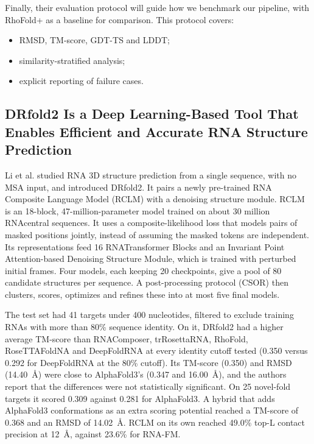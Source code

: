 \documentclass{FastFyp}
\begin{document}
Finally, their evaluation protocol will guide how we benchmark our pipeline, with RhoFold+ as a baseline for comparison. This protocol covers:
\begin{itemize}
\item RMSD, TM-score, GDT-TS and LDDT;
\item similarity-stratified analysis;
\item explicit reporting of failure cases.
\end{itemize}

\subsection{DRfold2 Is a Deep Learning-Based Tool That Enables Efficient and Accurate RNA Structure Prediction}\label{sec:drfold2}
Li et al. \cite{ref:Li:2026} studied RNA 3D structure prediction from a single sequence, with no MSA input, and introduced DRfold2. It pairs a newly pre-trained RNA Composite Language Model (RCLM) with a denoising structure module. RCLM is an 18-block, 47-million-parameter model trained on about 30 million RNAcentral sequences. It uses a composite-likelihood loss that models pairs of masked positions jointly, instead of assuming the masked tokens are independent. Its representations feed 16 RNATransformer Blocks and an Invariant Point Attention-based Denoising Structure Module, which is trained with perturbed initial frames. Four models, each keeping 20 checkpoints, give a pool of 80 candidate structures per sequence. A post-processing protocol (CSOR) then clusters, scores, optimizes and refines these into at most five final models.

The test set had 41 targets under 400 nucleotides, filtered to exclude training RNAs with more than 80\% sequence identity. On it, DRfold2 had a higher average TM-score than RNAComposer, trRosettaRNA, RhoFold, RoseTTAFoldNA and DeepFoldRNA at every identity cutoff tested (0.350 versus 0.292 for DeepFoldRNA at the 80\% cutoff). Its TM-score (0.350) and RMSD (14.40~\AA{}) were close to AlphaFold3's (0.347 and 16.00~\AA{}), and the authors report that the differences were not statistically significant. On 25 novel-fold targets it scored 0.309 against 0.281 for AlphaFold3. A hybrid that adds AlphaFold3 conformations as an extra scoring potential reached a TM-score of 0.368 and an RMSD of 14.02~\AA{}. RCLM on its own reached 49.0\% top-L contact precision at 12~\AA{}, against 23.6\% for RNA-FM.
\end{document}
